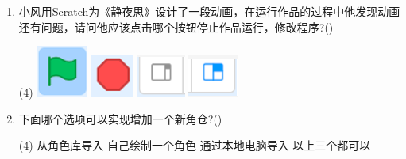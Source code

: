 \documentclass[10pt, a4paper]{article}
\begin{document}
\begin{enumerate}
        \item 小风用Scratch为《静夜思》设计了一段动画，在运行作品的过程中他发现动画还有问题，请问他应该点击哪个按钮停止作品运行，修改程序?(\qquad)
        \begin{tasks}(4)
            \task \includegraphics[width=.04\textwidth]{24a.png}
            \task \includegraphics[width=.04\textwidth]{24b.png}
            \task \includegraphics[width=.05\textwidth]{24c.png}
            \task \includegraphics[width=.05\textwidth]{24d.png}
        \end{tasks}
        
        \item 下面哪个选项可以实现增加一个新角仓?(\qquad)
        \begin{tasks}(4)
            \task 从角色库导入
            \task 自己绘制一个角色
            \task 通过本地电脑导入
            \task 以上三个都可以
        \end{tasks}
    \end{enumerate}
\end{document}
